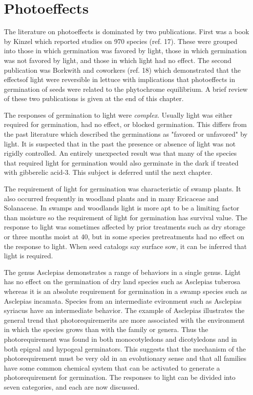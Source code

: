 \chapter{Photoeffects}

The literature on photoeffects is dominated by two publications. First was a
book by Kinzel which reported studies on 970 species (ref. 17). These were grouped
into those in which germination was favored by light, those in which germination was
not favored by light, and those in which light had no effect. The second publication was
Borkwith and coworkers (ref. 18) which demonstrated that the effectsof light were
reversible in lettuce with implications that photoeffects in germination of seeds were
related to the phytochrome equilibrium. A brief review of these two publications is
given at the end of this chapter.

The responses of germination to light were \textit{complex}. Usually light was either
required for germination, had no effect, or blocked germination. This differs from the
past literature which described the germinations as "favored or unfavored" by light. It
is suspected that in the past the presence or absence of light was not rigidly controlled.
An entirely unexpected result was that many of the species that required light for
germination would also germinate in the dark if treated with gibberelic acid-3. This
subject is deferred until the next chapter.

The requirement of light for germination was characteristic of swamp plants. It
also occurred frequently in woodland plants and in many Ericaceae and Solanaceae.
In swamps and woodlands light is more apt to be a limiting factor than moisture so the
requirement of light for germination has survival value. The response to light was
sometimes affected by prior treatments such as dry storage or three months moist at
40, but in some species pretreatments had no effect on the response to light. When
seed catalogs say surface sow, it can be inferred that light is required.

The genus Asclepias demonstrates a range of behaviors in a single genus.
Light has no effect on the germination of dry land species such as Asclepias tuberosa
whereas it is an absolute requirement for germination in a swamp species such as
Asclepias incamata. Species from an intermediate evironment such as Asclepias
syriacus have an intermediate behavior. The example of Asclepias illustrates the
general trend that photorequiremerits are more associated with the environment in
which the species grows than with the family or genera. Thus the photorequirement
was found in both monocotyledons and dicotyledons and in both epigeal and
hypogeal germinators. This suggests that the mechanism of the photorequirement
must be very old in an evolutionary sense and that all families have some common
chemical system that can be activated to generate a photorequirement for germination.
The responses to light can be divided into seven categories, and each are now
discussed.

